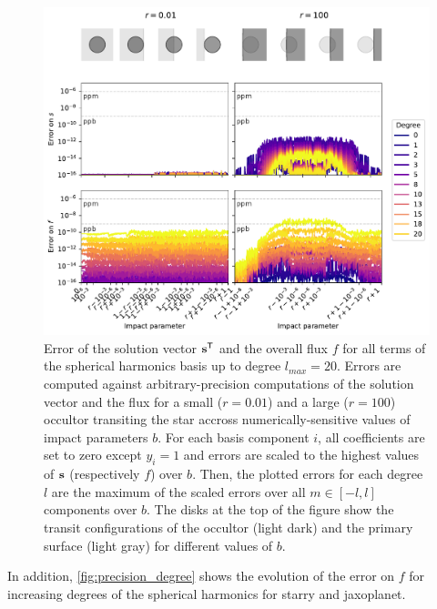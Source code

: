 \documentclass[modern]{aastex631}
\begin{document}
\begin{figure}[H]
    \begin{center}
        \includegraphics[width=\textwidth]{../workflows/precision/figures/error_jax.pdf}
        \caption{Error of the solution vector ${\mathbf{s}}^\mathsf{T}$ and the overall flux $f$ for all terms of the spherical harmonics basis up to degree $l_{max}=20$. Errors are computed against arbitrary-precision computations of the solution vector and the flux for a small ($r=0.01$) and a large ($r=100$) occultor transiting the star accross numerically-sensitive values of impact parameters $b$. For each basis component $i$, all coefficients are set to zero except $y_i=1$ and errors are scaled to the highest values of ${\mathbf{s}}$ (respectively $f$) over $b$. Then, the plotted errors for each degree $l$ are the maximum of the scaled errors over all $m\in [-l, l]$ components over $b$. The disks at the top of the figure show the transit configurations of the occultor (light dark) and the primary surface (light gray) for different values of $b$. }
        \label{fig:precision_s}
    \end{center}
\end{figure}
In addition, \autoref{fig:precision_degree} shows the evolution of the error on $f$ for increasing degrees of the spherical harmonics for \textsf{starry} and \textsf{jaxoplanet}.
\end{document}
